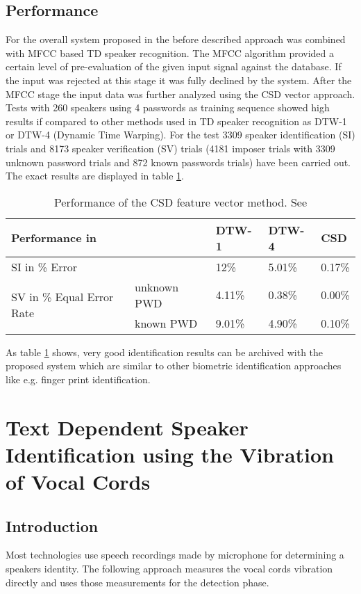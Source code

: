 \documentclass[12pt]{article}
\begin{document}
\subsection{Performance}
For the overall system proposed in \cite{sinogram} the before described approach was combined with MFCC based TD speaker recognition. The MFCC algorithm provided a certain level of pre-evaluation of the given input signal against the database. If the input was rejected at this stage it was fully declined by the system. After the MFCC stage the input data was further analyzed using the CSD vector approach. 
Tests with 260 speakers using 4 passwords as training sequence showed high results if compared to other methods used in TD speaker recognition as DTW-1 or DTW-4 (Dynamic Time Warping). For the test 3309 speaker identification (SI) trials and 8173 speaker verification (SV) trials (4181 imposer trials with 3309 unknown password  trials and 872 known passwords trials) have been carried out.
The exact results are displayed in table \ref{tab:sinogram}.
\begin{table}[!h]
\centering
\begin{tabular}{|l|l|l|l|l|}
\hline
\multicolumn{2}{|l|}{Performance in}                                       & DTW-1  & DTW-4  & CSD    \\ \hline
\multicolumn{2}{|l|}{SI in \% Error}                   & 12\%   & 5.01\% & 0.17\% \\ \hline
\multirow{2}{*}{SV in \% Equal Error Rate} & unknown PWD & 4.11\% & 0.38\% & 0.00\% \\ \cline{2-5} 
                                                             & known PWD   & 9.01\% & 4.90\% & 0.10\% \\ \hline
\end{tabular}
\caption{Performance of the CSD feature vector method. See \cite{sinogram}}
\label{tab:sinogram}
\end{table}
 As table \ref{tab:sinogram} shows, very good identification results can be archived with the proposed system which are similar to other biometric identification approaches like e.g. finger print identification.
\section{Text Dependent Speaker Identification using the Vibration of Vocal Cords}
\subsection{Introduction}
Most technologies use speech recordings made by microphone for determining a speakers identity. The following approach measures the vocal cords vibration directly and uses those measurements for the detection phase.\cite{piezo}  
\end{document}
